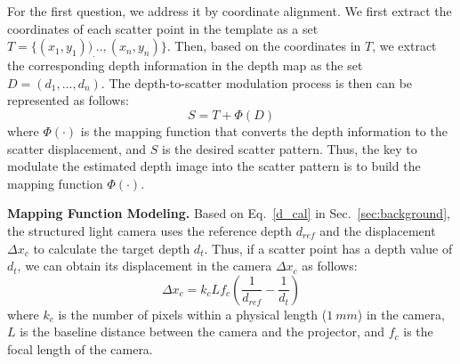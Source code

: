  


For the first question, we address it by coordinate alignment. We first extract the coordinates of each scatter point in the template as a set $T = \{(x_1, y_1))_ ..., (x_n, y_n)\}$. Then, based on the coordinates in $T$, we extract the corresponding depth information in the depth map as the set $D = (d_1, ..., d_n)$. 
The depth-to-scatter modulation process is then can be represented as follows:
\begin{equation}
	S = T + \Phi(D)
	\label{modulation_process}
\end{equation}
where $\Phi(\cdot)$ is the mapping function that converts the depth information to the scatter displacement, and $S$ is the desired scatter pattern.  
Thus, the key to modulate the estimated depth image into the scatter pattern is to build the mapping function $\Phi(\cdot)$. 

\textbf{Mapping Function Modeling.} 
Based on Eq.~\ref{d_cal} in Sec.~\ref{sec:background}, the structured light camera uses the reference depth $d_{ref}$ and the displacement $\Delta x_c$ to calculate the target depth $d_t$. Thus, if a scatter point has a depth value of $d_{t}$, we can obtain its displacement in the camera $\Delta x_c$ as follows:
\begin{equation}
	\Delta x_c = k_cLf_c(\frac{1}{d_{ref}} - \frac{1}{d_t}) 
	\label{d_to_xc}
\end{equation}
where $k_c$ is the number of pixels within a physical length ($1~mm$) in the camera, $L$ is the baseline distance between the camera and the projector, and $f_c$ is the focal length of the camera.

